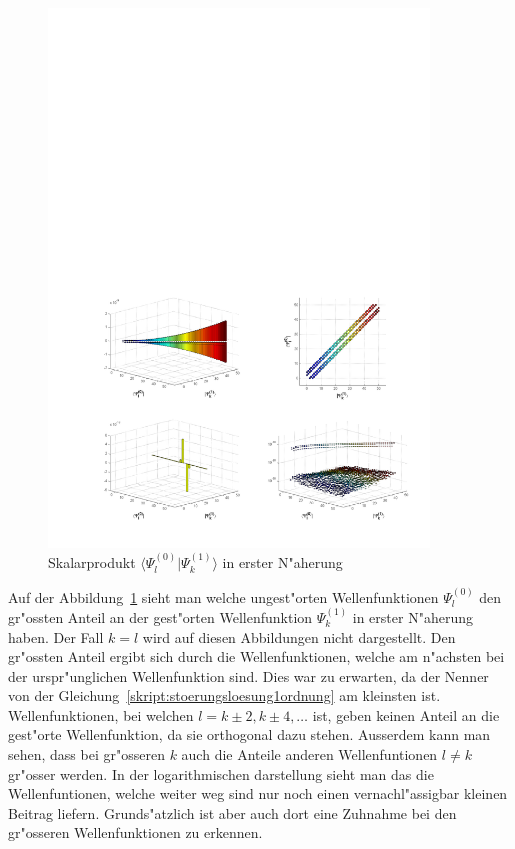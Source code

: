 \begin{refsection}
\begin{figure}[h]	%
\centering
\includegraphics[width=0.9\textwidth]{anharmonisch/images/x4/Stoerung1Skalare.pdf}
\caption{Skalarprodukt $\langle\Psi_l^{(0)}|\Psi_k^{(1)}\rangle$ in erster N"aherung
\label{skript:x4_Stoerung1Skalare}}
\end{figure}

Auf der Abbildung~\ref{skript:x4_Stoerung1Skalare} sieht man welche ungest"orten Wellenfunktionen $\Psi_l^{(0)}$ den gr"ossten Anteil an der gest"orten Wellenfunktion $\Psi_k^{(1)}$ in erster N"aherung haben. Der Fall $k=l$ wird auf diesen Abbildungen nicht dargestellt. Den gr"ossten Anteil ergibt sich durch die Wellenfunktionen, welche am n"achsten bei der urspr"unglichen Wellenfunktion sind. Dies war zu erwarten, da der Nenner von der Gleichung~\ref{skript:stoerungsloesung1ordnung} am kleinsten ist. Wellenfunktionen, bei welchen $l=k\pm 2,k\pm 4,\dots$ ist, geben keinen Anteil an die gest"orte Wellenfunktion, da sie orthogonal dazu stehen. Ausserdem kann man sehen, dass bei gr"osseren $k$ auch die Anteile anderen Wellenfuntionen $l\neq k$ gr"osser werden. In der logarithmischen darstellung sieht man das die Wellenfuntionen, welche weiter weg sind nur noch einen vernachl"assigbar kleinen Beitrag liefern. Grunds"atzlich ist aber auch dort eine Zuhnahme bei den gr"osseren Wellenfunktionen zu erkennen.



\end{refsection}
